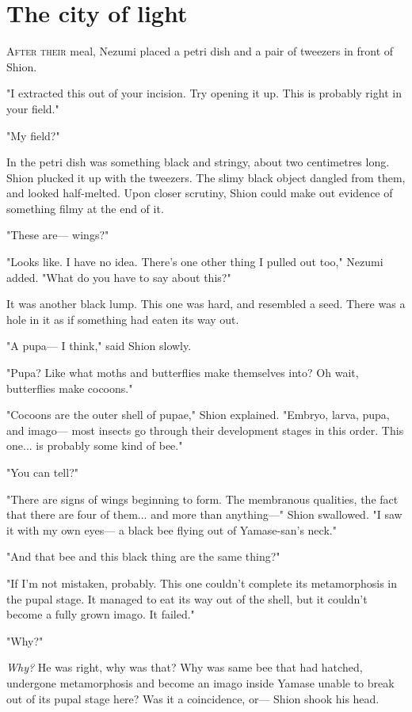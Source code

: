 
\chapter{The city of light}

\lettrine{A}{fter their} meal, Nezumi placed a petri dish and a pair of tweezers in
front of Shion.

"I extracted this out of your incision. Try opening it up. This is
probably right in your field."

"My field?"

In the petri dish was something black and stringy, about two centimetres
long. Shion plucked it up with the tweezers. The slimy black object
dangled from them, and looked half-melted. Upon closer scrutiny, Shion
could make out evidence of something filmy at the end of it.

"These are--- wings?"

"Looks like. I have no idea. There's one other thing I pulled out too,"
Nezumi added. "What do you have to say about this?"

It was another black lump. This one was hard, and resembled a seed.
There was a hole in it as if something had eaten its way out.

"A pupa--- I think," said Shion slowly.

"Pupa? Like what moths and butterflies make themselves into? Oh wait,
butterflies make cocoons."

"Cocoons are the outer shell of pupae," Shion explained. "Embryo, larva,
pupa, and imago--- most insects go through their development stages in
this order. This one... is probably some kind of bee."

"You can tell?"

"There are signs of wings beginning to form. The membranous qualities,
the fact that there are four of them... and more than anything---" Shion
swallowed. "I saw it with my own eyes--- a black bee flying out of
Yamase-san's neck."

"And that bee and this black thing are the same thing?"

"If I'm not mistaken, probably. This one couldn't complete its
metamorphosis in the pupal stage. It managed to eat its way out of the
shell, but it couldn't become a fully grown imago. It failed."

"Why?"

\emph{Why?} He was right, why was that? Why was same bee that had hatched,
undergone metamorphosis and become an imago inside Yamase unable to
break out of its pupal stage here? Was it a coincidence, or--- Shion shook
his head.

